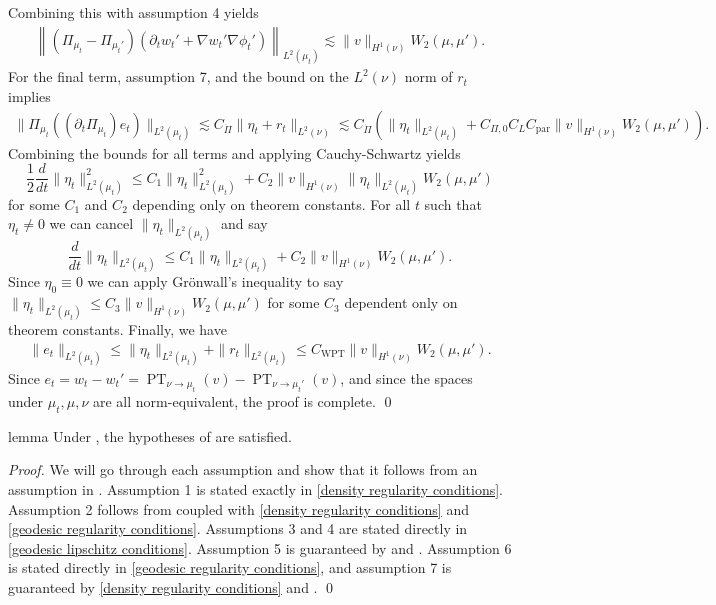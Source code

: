 \documentclass[11pt]{article}
\newcommand{\PT}{\operatorname{PT}}
\begin{document}
Combining this with assumption 4 yields
\begin{align*}
    \left\|(\Pi_{\mu_t} - \Pi_{\mu_t'})(\partial_tw_t'  + \nabla w_t'\nabla \phi_t')\right\|_{L^2(\mu_t)} \lesssim  \|v\|_{H^1(\nu)}W_2(\mu, \mu').
\end{align*}
For the final term, assumption 7,  and the bound on the $L^2(\nu)$ norm of $r_t$ implies
\begin{align*}
    \|\Pi_{\mu_t}((\partial_t\Pi_{\mu_t})e_t)\|_{L^2(\mu_t)} \lesssim  C_{\dot \Pi}\|\eta_t + r_t\|_{L^2(\nu)} \lesssim  C_{\dot \Pi}(\|\eta_t\|_{L^2(\mu_t)} + C_{\Pi, 0} C_L C_{\text{par}}\|v\|_{H^1(\nu)}W_2(\mu, \mu')).
\end{align*}
Combining the bounds for all terms and applying Cauchy-Schwartz yields
\begin{equation*}
    \frac{1}{2}\frac{d}{dt}\|\eta_t\|^2_{L^2(\mu_t)} \leq C_1\|\eta_t\|_{L^2(\mu_t)}^2 + C_2 \|v\|_{H^1(\nu)}\|\eta_t\|_{L^2(\mu_t)}  W_2(\mu, \mu')
\end{equation*}
for some $C_1$ and $C_2$ depending only on theorem constants. For all $t$ such that $\eta_t \neq 0$ we can cancel $\|\eta_t\|_{L^2(\mu_t)}$ and say
\[\frac{d}{dt}\|\eta_t\|_{L^2(\mu_t)} \leq C_1\|\eta_t\|_{L^2(\mu_t)} + C_2\|v\|_{H^1(\nu)}W_2(\mu, \mu').\]
Since $\eta_0 \equiv 0$ we can apply Gr\"onwall's inequality to say $\|\eta_t\|_{L^2(\mu_t)} \leq C_3\|v\|_{H^1(\nu)}W_2(\mu, \mu')$ for some $C_3$ dependent only on theorem constants. Finally, we have
\begin{align*}
    \|e_t\|_{L^2(\mu_t)} \leq \|\eta_t\|_{L^2(\mu_t)} + \|r_t\|_{L^2(\mu_t)} \leq C_{\text{WPT}}\|v\|_{H^1(\nu)}W_2(\mu, \mu').
\end{align*}
Since $e_t = w_t - w_t' = {\PT}_{\nu \rightarrow \mu_t}(v) - {\PT}_{\nu \rightarrow \mu_t'}(v)$, and since the spaces under $\mu_t, \mu, \nu$ are all norm-equivalent, the proof is complete. \qed{}

\begin{restatable}{lemma}{}
    Under , the hypotheses of  are satisfied.
\end{restatable}
\noindent \textit{Proof.} We will go through each assumption and show that it follows from an assumption in . Assumption 1 is stated exactly in \ref{density regularity conditions}. Assumption 2 follows from  coupled with \ref{density regularity conditions} and \ref{geodesic regularity conditions}. Assumptions 3 and 4 are stated directly in \ref{geodesic lipschitz conditions}. Assumption 5 is guaranteed by  and . Assumption 6 is stated directly in \ref{geodesic regularity conditions}, and assumption 7
is guaranteed by \ref{density regularity conditions} and .
\qed{}
\end{document}
